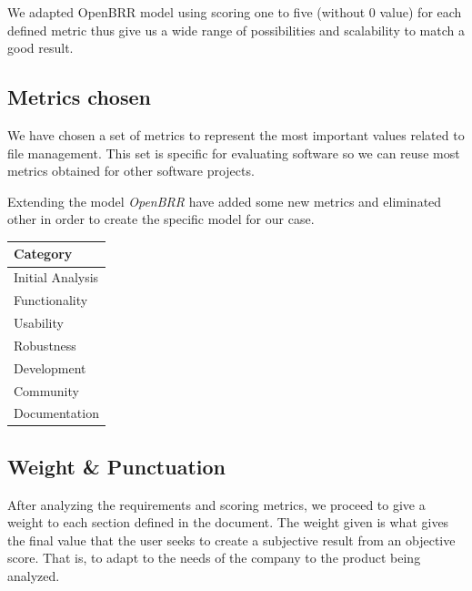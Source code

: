 \documentclass[11pt]{scrartcl}
\begin{document}
\par We adapted OpenBRR model using scoring one to five (without 0 value) for each defined metric thus give us a wide range of possibilities and scalability to match a good result.

\subsection{Metrics chosen}

\par We have chosen a set of metrics to represent the most important values ​​related to file management. This set is specific for evaluating software so we can reuse most metrics obtained for other software projects.

\par Extending the model \emph{OpenBRR} have added some new metrics and eliminated other in order to create the specific model for our case.

\begin{table}[H]
\centering
\begin{tabular}{|l|}
    \hline {\bf Category}\\
    \hline Initial Analysis\\
    \hline Functionality\\
    \hline Usability\\
    \hline Robustness\\
    \hline Development\\
    \hline Community\\
    \hline Documentation\\
    \hline
\end{tabular}
\end{table}

\subsection{Weight \& Punctuation}

After analyzing the requirements and scoring metrics, we proceed to give a weight to each section defined in the document. The weight given is what gives the final value that the user seeks to create a subjective result from an objective score. That is, to adapt to the needs of the company to the product being analyzed.
\end{document}
